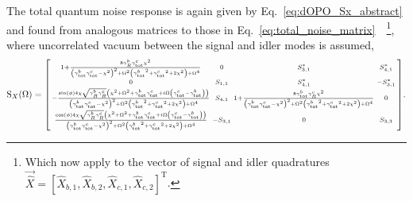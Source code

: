 
The total quantum noise response is again given by Eq.~\ref{eq:dOPO_Sx_abstract} and found from analogous matrices to those in Eq.~\ref{eq:total_noise_matrix}~\cite{}~\footnote{Which now apply to the vector of signal and idler quadratures $\vec{\hat X}=[\hat X_{b,1},\hat X_{b,2},\hat X_{c,1},\hat X_{c,2}]^\text{T}$.}, where uncorrelated vacuum between the signal and idler modes is assumed, %
\begin{equation}\label{eq:nOPO_full_freedom}
\text{S}_X(\Omega)=\begin{bsmallmatrix}
1+\frac{8 \gamma^b_R {\gamma^c_\text{tot}} \chi ^2}{\left({\gamma^b_\text{tot}} {\gamma^c_\text{tot}}-\chi ^2\right)^2+\Omega ^2 \left({\gamma^b_\text{tot}}^2+{\gamma^c_\text{tot}}^2+2 \chi ^2\right)+\Omega ^4} & 0 & S_{3,1}^* & S_{4,1}^* \\
0 & S_{1,1} & S_{4,1}^* & -S_{3,1}^* \\
-\frac{\sin (\phi )4 \chi  \sqrt{\gamma^b_R \gamma^c_R}  \left(\chi ^2+\Omega^2+\gamma^b_\text{tot}\gamma^c_\text{tot}+i\Omega\left(\gamma^c_\text{tot}-\gamma^b_\text{tot}\right)\right)}{\left({\gamma^b_\text{tot}} {\gamma^c_\text{tot}}-\chi ^2\right)^2+\Omega ^2 \left({\gamma^b_\text{tot}}^2+{\gamma^c_\text{tot}}^2+2 \chi ^2\right)+\Omega ^4} & S_{4,1} & 1+\frac{8 {\gamma^b_\text{tot}} \gamma^c_R  \chi ^2}{\left({\gamma^b_\text{tot}} {\gamma^c_\text{tot}}-\chi ^2\right)^2+\Omega ^2 \left({\gamma^b_\text{tot}}^2+{\gamma^c_\text{tot}}^2+2 \chi ^2\right)+\Omega ^4} & 0\\
\frac{\cos (\phi ) 4 \chi  \sqrt{\gamma^b_R \gamma^c_R} \left(\chi ^2+\Omega^2+\gamma^b_\text{tot}\gamma^c_\text{tot}+i\Omega\left(\gamma^c_\text{tot}-\gamma^b_\text{tot}\right)\right)}{\left({\gamma^b_\text{tot}} {\gamma^c_\text{tot}}-\chi ^2\right)^2+\Omega ^2 \left({\gamma^b_\text{tot}}^2+{\gamma^c_\text{tot}}^2+2 \chi ^2\right)+\Omega ^4} & -S_{3,1} & 0 & S_{3,3}
\end{bsmallmatrix}.\end{equation} 
